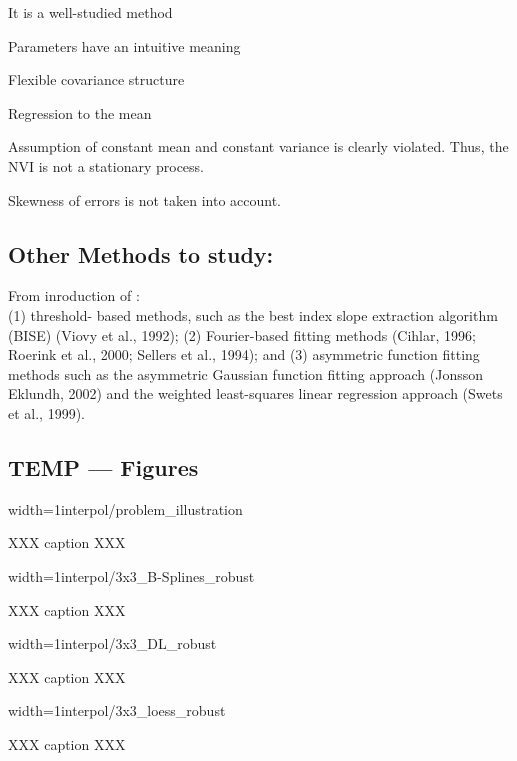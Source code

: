 \begin{my_pros_cons_table}{
    \item It is a well-studied method
    \item Parameters have an intuitive meaning
    \item Flexible covariance structure
  }{
    \item Regression to the mean
    \item Assumption of constant mean and constant variance is clearly violated. Thus, the NVI is not a stationary process.
    \item Skewness of errors is not taken into account.
  }
\end{my_pros_cons_table}


\subsection{Other Methods to study:}
From inroduction of \cite{chenSimpleMethodReconstructing2004a}:\\
(1) threshold-
based methods, such as the best index slope extraction
algorithm (BISE) (Viovy et al., 1992); (2) Fourier-based
fitting methods (Cihlar, 1996; Roerink et al., 2000; Sellers
et al., 1994); and (3) asymmetric function fitting methods
such as the asymmetric Gaussian function fitting approach
(Jonsson Eklundh, 2002) and the weighted least-squares
linear regression approach (Swets et al., 1999).


\subsection*{TEMP --- Figures}


\begin{my_figure}[h]{width=1\textwidth}{interpol/problem_illustration}
  \caption{XXX caption XXX}
  \label{fig:interpol/problem_illustration}
\end{my_figure}

\begin{my_figure}[h]{width=1\textwidth}{interpol/3x3_B-Splines_robust}
  \caption{XXX caption XXX}
  \label{fig:interpol/3x3_B-Splines_robust}
\end{my_figure}

\begin{my_figure}[h]{width=1\textwidth}{interpol/3x3_DL_robust}
  \caption{XXX caption XXX}
  \label{fig:interpol/3x3_DL_robust}
\end{my_figure}

\begin{my_figure}[h]{width=1\textwidth}{interpol/3x3_loess_robust}
  \caption{XXX caption XXX}
  \label{fig:interpol/3x3_loess_robust}
\end{my_figure}

